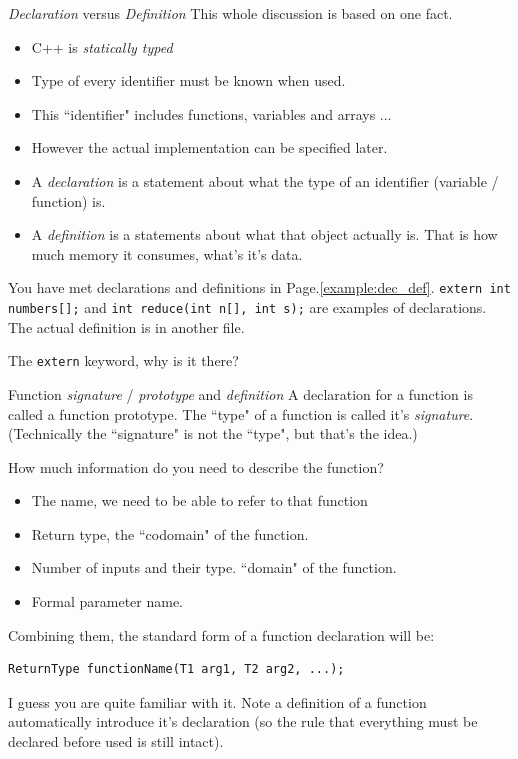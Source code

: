 \begin{frame}{\textit{Declaration} versus \textit{Definition}}
	This whole discussion is based on one fact. 
	\begin{itemize}
		\item C++ is \textit{statically typed}
		\item Type of every identifier must be known when used.
		\item This ``identifier" includes functions, variables and arrays ...
		\item However the actual implementation can be specified later.
		\item A \textit{declaration} is a statement about what the type of an identifier (variable / function) is. 
		\item A \textit{definition} is a statements about what that object actually is. That is how much memory it consumes, what's it's data.
	\end{itemize}
	
	You have met declarations and definitions in Page.\ref{example:dec_def}.
	\texttt{extern int numbers[];} and \texttt{int reduce(int n[], int s);} are examples of declarations. The actual definition is in another file.
	
	The \texttt{extern} keyword, why is it there? 
\end{frame}

\begin{frame}[fragile]{Function \textit{signature} / \textit{prototype} and \textit{definition}}
A declaration for a function is called a function prototype. The ``type" of a function is called it's \textit{signature}. (Technically the ``signature" is not the ``type", but that's the idea.)

How much information do you need to describe the function?
\begin{itemize}
	\item The name, we need to be able to refer to that function
	\item Return type, the ``codomain" of the function.
	\item Number of inputs and their type. ``domain" of the function.
	\item Formal parameter name.
\end{itemize}

Combining them, the standard form of a function declaration will be:
\begin{verbatim}
ReturnType functionName(T1 arg1, T2 arg2, ...);
\end{verbatim}
I guess you are quite familiar with it. Note a definition of a function automatically introduce it's declaration (so the rule that everything must be declared before used is still intact).
\end{frame}

